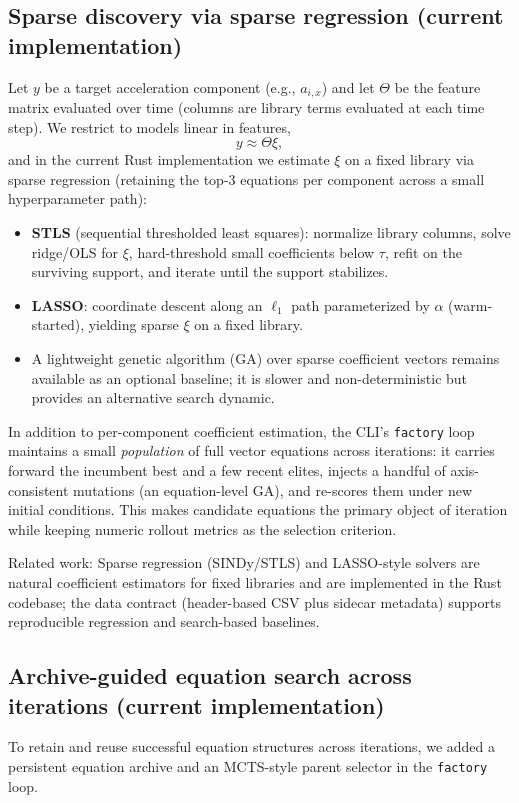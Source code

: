 \documentclass[11pt]{article}
\begin{document}
\subsection{Sparse discovery via sparse regression (current implementation)}
Let $y$ be a target acceleration component (e.g., $a_{i,x}$) and let $\Theta$ be the feature matrix evaluated over time (columns are library terms evaluated at each time step). We restrict to models linear in features,
\begin{equation*}
y \approx \Theta \xi,
\end{equation*}
and in the current Rust implementation we estimate $\xi$ on a fixed library via sparse regression (retaining the top-3 equations per component across a small hyperparameter path):
\begin{itemize}
\item \textbf{STLS} (sequential thresholded least squares): normalize library columns, solve ridge/OLS for $\xi$, hard-threshold small coefficients below $\tau$, refit on the surviving support, and iterate until the support stabilizes.
\item \textbf{LASSO}: coordinate descent along an $\ell_1$ path parameterized by $\alpha$ (warm-started), yielding sparse $\xi$ on a fixed library.
\item A lightweight genetic algorithm (GA) over sparse coefficient vectors remains available as an optional baseline; it is slower and non-deterministic but provides an alternative search dynamic.
\end{itemize}

In addition to per-component coefficient estimation, the CLI’s \texttt{factory} loop maintains a small \emph{population} of full vector equations across iterations: it carries forward the incumbent best and a few recent elites, injects a handful of axis-consistent mutations (an equation-level GA), and re-scores them under new initial conditions. This makes candidate equations the primary object of iteration while keeping numeric rollout metrics as the selection criterion.

Related work: Sparse regression (SINDy/STLS)\cite{Brunton2016} and LASSO-style solvers\cite{Tibshirani1996} are natural coefficient estimators for fixed libraries and are implemented in the Rust codebase; the data contract (header-based CSV plus sidecar metadata) supports reproducible regression and search-based baselines.

\subsection{Archive-guided equation search across iterations (current implementation)}
To retain and reuse successful equation structures across iterations, we added a persistent equation archive and an MCTS-style parent selector in the \texttt{factory} loop.
\end{document}
